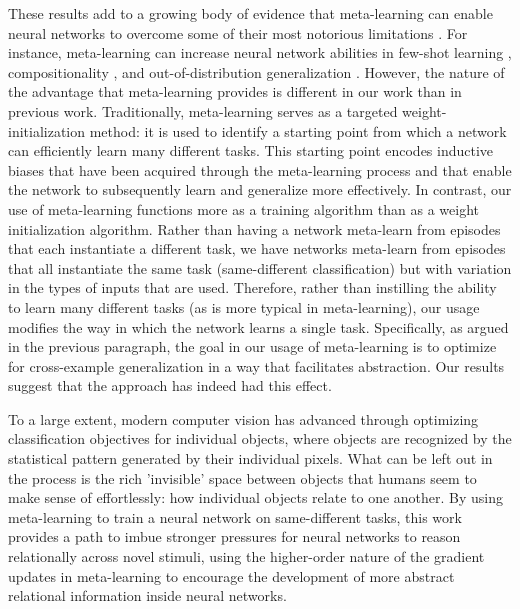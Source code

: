 \documentclass[10pt,letterpaper]{article}
\begin{document}
These results add to a growing body of evidence that meta-learning can enable neural networks to overcome some of their most notorious limitations \cite{irie2024neural}. For instance, meta-learning can increase neural network abilities in few-shot learning \cite{hochreiter2001learning,mccoy2023modeling}, compositionality \cite{lake2023human}, and out-of-distribution generalization \cite{finn2017model}. 
However, the nature of the advantage that meta-learning provides is different in our work than in previous work. 
Traditionally, meta-learning serves as a targeted weight-initialization method: %
it is used to identify a starting point from which a network can efficiently learn many different tasks. This starting point encodes inductive biases that have been acquired through the meta-learning process and that enable the network to subsequently learn and generalize more effectively.
In contrast, our use of meta-learning functions more as a training algorithm than as a weight initialization algorithm. Rather than having a network meta-learn from episodes that each instantiate a different task, we have networks meta-learn from episodes that all instantiate the same task (same-different classification) but with variation in the types of inputs that are used. Therefore, rather than instilling the ability to learn many different tasks (as is more typical in meta-learning), our usage modifies the way in which the network learns a single task. Specifically, as argued in the previous paragraph, the goal in our usage of meta-learning is to optimize for cross-example generalization in a way that facilitates abstraction. Our results suggest that the approach has indeed had this effect.






To a large extent, modern computer vision has advanced through optimizing 
classification objectives for individual objects, where objects are recognized by the statistical pattern generated by their individual pixels. 
What can be left out in the process is the rich 'invisible' space between objects that humans seem to make sense of effortlessly: how individual objects relate to one another. By using meta-learning to train a neural network on same-different tasks, this work provides a path to imbue stronger pressures
for neural networks to reason relationally across novel stimuli, using the higher-order nature of the gradient updates in meta-learning to encourage the development of more abstract relational information inside neural networks.
\end{document}
